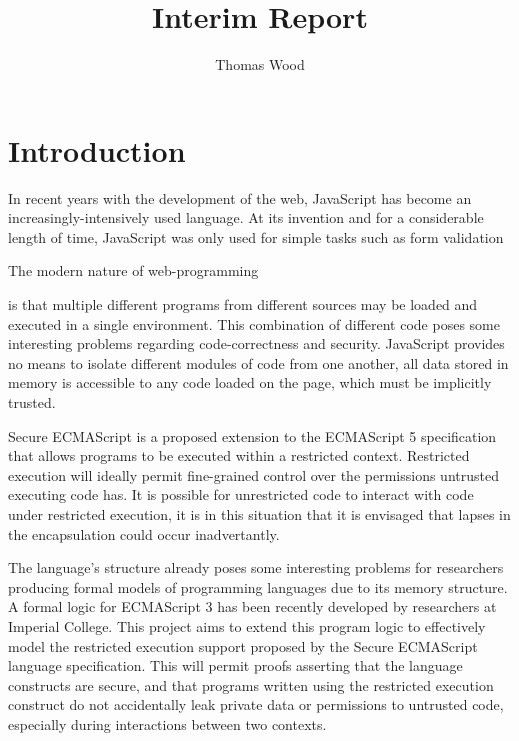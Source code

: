 \documentclass[a4paper]{report}
\title{Interim Report}
\author{Thomas Wood}
\begin{document}
\maketitle

\begin{abstract}
\end{abstract}

\chapter{Introduction}
  In recent years with the development of the web, JavaScript has become an
  increasingly-intensively used language. At its invention and for a
  considerable length of time, JavaScript was only used for simple tasks such as
  form validation
  
  The modern nature of web-programming

  is that multiple different programs from different sources may be loaded and
  executed in a single environment. This combination of different code poses
  some interesting problems regarding code-correctness and security. JavaScript
  provides no means to isolate different modules of code from one another, all
  data stored in memory is accessible to any code loaded on the page, which must
  be implicitly trusted.

  Secure ECMAScript is a proposed extension to the ECMAScript 5 specification
  that allows programs to be executed within a restricted context. Restricted
  execution will ideally permit fine-grained control over the permissions
  untrusted executing code has. It is possible for unrestricted code to interact
  with code under restricted execution, it is in this situation that it is
  envisaged that lapses in the encapsulation could occur inadvertantly.

  The language's structure already poses some interesting problems for
  researchers producing formal models of programming languages due to its memory
  structure.  A formal logic for ECMAScript 3 has been recently developed by
  researchers at Imperial College. This project aims to extend this program
  logic to effectively model the restricted execution support proposed by the
  Secure ECMAScript language specification. This will permit proofs asserting
  that the language constructs are secure, and that programs written using the
  restricted execution construct do not accidentally leak private data or
  permissions to untrusted code, especially during interactions between two
  contexts.
\end{document}
